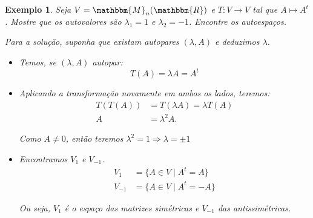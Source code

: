 \documentclass{article}
\newcommand{\REAL} {\mathbbm{R}}
\newcommand{\MATRIX}[1] {\mathbbm{M}_{#1} (\REAL)}
\newcommand{\deffunc}[3] {#1: #2 \longrightarrow #3}
\newtheorem{example}{Exemplo}[section]
\begin{document}
    \begin{example}
        Seja $V = \MATRIX{n}$ e $\deffunc{T}{V}{V}$ tal que $A \mapsto A^t$. Mostre que os autovalores são $\lambda_1 = 1$ e $\lambda_2 = -1$.
        Encontre os autoespaços.

        Para a solução, suponha que existam autopares $(\lambda, A)$ e deduzimos $\lambda$.

        \begin{itemize}
            \item Temos, se $(\lambda, A)$ autopar:
                \[
                    T(A) = \lambda A = A^t
                \]

            \item Aplicando a transformação novamente em ambos os lados, teremos:
                \begin{align*}
                    T(T(A)) &= T(\lambda A) = \lambda T(A)\\
                    A &= \lambda^2 A.
                \end{align*}

                Como $A \neq 0$, então teremos $\lambda^2 = 1 \Rightarrow \lambda = \pm 1$

            \item Encontramos $V_1$ e $V_{-1}$.
                \begin{align*}
                    V_1 &= \{ A \in V \mid A^t = A \}\\
                    V_{-1} &= \{ A \in V \mid A^t = -A \}
                \end{align*}

                Ou seja, $V_1$ é o espaço das matrizes simétricas e $V_{-1}$ das antissimétricas.
        \end{itemize}
    \end{example}
\end{document}

